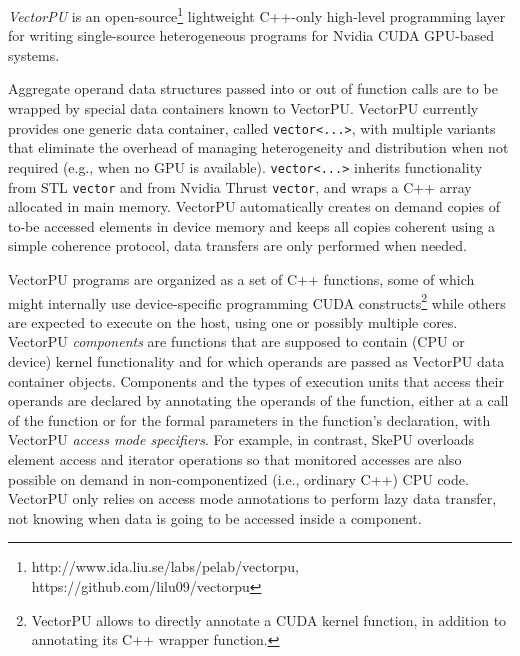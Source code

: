 \textit{VectorPU} \cite{VectorPU-2017} is an open-source\footnote{http://www.ida.liu.se/labs/pelab/vectorpu, https://github.com/lilu09/vectorpu} lightweight C++-only 
high-level programming layer
for writing single-source heterogeneous programs for Nvidia CUDA GPU-based systems.

Aggregate operand data structures 
passed into or out of  function calls are
to be wrapped by special data containers known to VectorPU.
VectorPU currently provides one generic data container,
called \verb+vector<...>+,
with multiple variants that 
eliminate the overhead of managing heterogeneity and distribution when not required (e.g., when no GPU is available). 
\verb+vector<...>+ inherits functionality from STL \verb.vector. 
and from Nvidia Thrust \verb.vector., and
wraps a C++ array allocated in main memory. 
VectorPU automatically creates on demand
copies of to-be accessed elements in device memory and keeps all copies coherent using
a simple coherence protocol, data transfers are only performed when needed. 

VectorPU programs are organized as a set of C++ functions, some of which
might internally use device-specific programming CUDA constructs\footnote{%
VectorPU allows to directly annotate a CUDA kernel function, in addition to annotating its C++ wrapper function.} while others
are expected to execute on the host, using one or possibly multiple cores.
VectorPU \emph{components} are functions that are supposed to contain (CPU or device)
kernel functionality and for which  operands are passed as VectorPU data container objects. 
Components and the types of execution units that
access their operands are declared 
by annotating the operands of the function, either at a call of the function
or for the formal parameters in the function's declaration, 
with VectorPU \emph{access mode specifiers}. For example, in contrast,  SkePU \cite{Enmyren10}  overloads element
access and iterator operations so that monitored 
accesses are also possible on demand in non-componentized (i.e., 
ordinary C++) CPU code.
VectorPU only relies on access mode annotations 
to perform lazy data transfer,
not knowing when data is going to be accessed inside a component.

